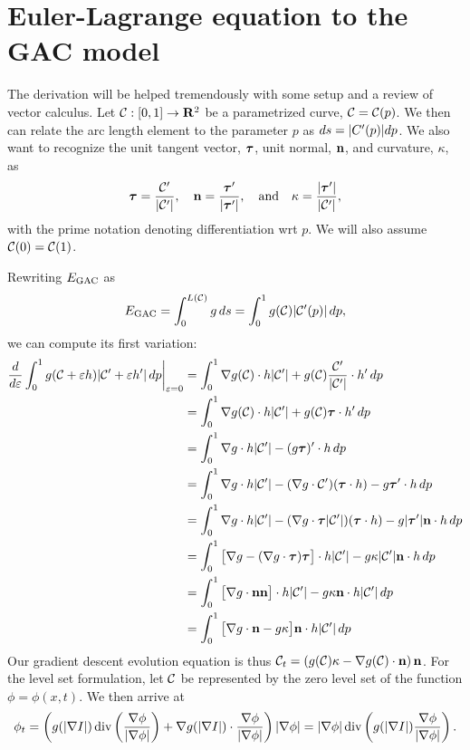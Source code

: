 \section{Euler-Lagrange equation to the GAC model}
The derivation will be helped tremendously with some setup and a review of vector calculus. Let $\mathcal{C}: [0,1]\rightarrow \mathbf{R}^2$ be a parametrized curve, $\mathcal{C} = \mathcal{C}(p)$. We then can relate the arc length element to the parameter $p$ as $ds = \lvert C'(p)\rvert dp$. We also want to recognize the unit tangent vector, $\boldsymbol{\tau}$, unit normal, $\mathbf{n}$, and curvature, $\kappa$, as 
\begin{align*}
\boldsymbol{\tau} 
= \frac{\mathcal{C}'}{\lvert\mathcal{C}'\rvert},\quad 
\mathbf{n} 
= \frac{ \boldsymbol{\tau} '}{\lvert\boldsymbol{\tau}'\rvert},
\quad\text{and}\quad 
\kappa = \frac{ \lvert\boldsymbol{\tau}'\rvert }{ \lvert \mathcal{C}' \rvert },
\end{align*}
with the prime notation denoting differentiation wrt $p$. We will also assume $\mathcal{C}(0) = \mathcal{C}(1)$. 

Rewriting $E_\textrm{GAC}$ as 
\begin{align*}
E_\textrm{GAC} = \int^{L(\mathcal{C})}_0 g \, ds 
= \int^1_0 g(\mathcal{C}) \lvert\mathcal{C}'(p)\rvert \, dp ,
\end{align*} 
we can compute its first variation: 
\begin{align*}
\frac{d}{d\varepsilon} \int^1_0 g(\mathcal{C} + \varepsilon h) \lvert\mathcal{C}' + \varepsilon h'\rvert \, dp \bigg\rvert_{\varepsilon = 0}
&=  \int^1_0 \nabla g(\mathcal{C}) \cdot h \lvert\mathcal{C}'\rvert + g(\mathcal{C}) \frac{\mathcal{C}'}{\lvert\mathcal{C}'\rvert} \cdot h' \,dp 
\\
&=\int^1_0 \nabla g(\mathcal{C}) \cdot h \lvert\mathcal{C}'\rvert + g(\mathcal{C}) \boldsymbol{\tau} \cdot h' \,dp 
\\
&=\int^1_0 \nabla g \cdot h \lvert\mathcal{C}'\rvert - ( g \boldsymbol{\tau})' \cdot h \, dp
\\
&=\int^1_0 \nabla g \cdot h \lvert\mathcal{C}'\rvert - (\nabla g \cdot \mathcal{C}')(\boldsymbol{\tau} \cdot h) - g\boldsymbol{\tau} ' \cdot h \, dp
\\
&=\int^1_0 \nabla g \cdot h \lvert\mathcal{C}'\rvert - (\nabla g \cdot \boldsymbol{\tau} \lvert\mathcal{C}'\rvert )(\boldsymbol{\tau} \cdot h) - g\lvert\boldsymbol{\tau}'\rvert \mathbf{n} \cdot h \, dp
\\
&=\int^1_0 \big[ \nabla g  - (\nabla g \cdot \boldsymbol{\tau} )\boldsymbol{\tau} \big] \cdot h \lvert\mathcal{C}'\rvert - g\kappa \lvert\mathcal{C}'\rvert \mathbf{n} \cdot h \, dp
\\
&=\int^1_0 \big[\nabla g \cdot \mathbf{n} \mathbf{n} \big] \cdot h \lvert\mathcal{C}'\rvert - g\kappa  \mathbf{n} \cdot h \lvert\mathcal{C}'\rvert \, dp
\\
&=\int^1_0 \big[ \nabla g \cdot \mathbf{n} - g\kappa \big] \mathbf{n}  \cdot h \lvert\mathcal{C}'\rvert \, dp
\\ 
\end{align*}
Our gradient descent evolution equation is thus $\mathcal{C}_t = \left( g(\mathcal{C}) \kappa - \nabla g(\mathcal{C}) \cdot \mathbf{n} \right) \mathbf{n} $.
For the level set formulation, let $\mathcal{C}$ be represented by the zero level set of the function $\phi = \phi(x, t)$. We then arrive at 
\begin{align*}
\phi_t = \left(
g( \lvert\nabla I \rvert ) \operatorname{div}\left( \frac{\nabla \phi}{\lvert\nabla \phi\rvert} \right)
	+  \nabla g(  \lvert\nabla I \rvert )\cdot  \frac{\nabla \phi}{\lvert\nabla \phi\rvert}
\right) \lvert \nabla \phi \rvert
= \lvert\nabla \phi\rvert \operatorname{div}\left( 
g(  \lvert\nabla I \rvert ) \frac{\nabla \phi}{\lvert\nabla \phi\rvert}
\right) .
\end{align*}


